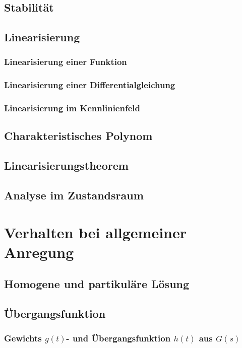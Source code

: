 \documentclass[12pt]{article}
\begin{document}
\subsection{Stabilität}
\subsection{Linearisierung}
\subsubsection{Linearisierung einer Funktion}
\subsubsection{Linearisierung einer Differentialgleichung}
\subsubsection{Linearisierung im Kennlinienfeld}
\subsection{Charakteristisches Polynom}
\subsection{Linearisierungstheorem}
\subsection{Analyse im Zustandsraum}
\clearpage
\section{Verhalten bei allgemeiner Anregung}
\subsection{Homogene und partikuläre Lösung}
\subsection{Übergangsfunktion}
\subsubsection{Gewichts \(g(t)\)- und Übergangsfunktion \(h(t)\) aus \(G(s)\)}
\end{document}
